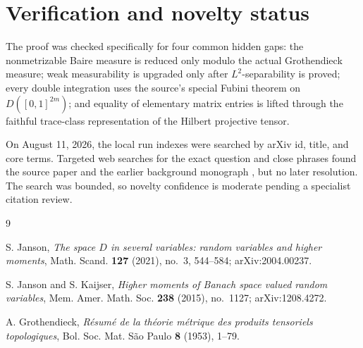 \documentclass[11pt]{article}
\begin{document}
\section{Verification and novelty status}

The proof was checked specifically for four common hidden gaps: the
nonmetrizable Baire measure is reduced only modulo the actual Grothendieck
measure; weak measurability is upgraded only after $L^2$-separability is
proved; every double integration uses the source's special Fubini theorem on
$D([0,1]^{2m})$; and equality of elementary matrix entries is lifted through
the faithful trace-class representation of the Hilbert projective tensor.

On August 11, 2026, the local run indexes were searched by arXiv id, title,
and core terms.  Targeted web searches for the exact question and close
phrases found the source paper and the earlier background monograph
\cite{JansonKaijser}, but no later resolution.  The search was bounded, so
novelty confidence is moderate pending a specialist citation review.

\begin{thebibliography}{9}

S. Janson,
\emph{The space $D$ in several variables: random variables and higher
moments},
Math. Scand. \textbf{127} (2021), no.~3, 544--584;
arXiv:2004.00237.

S. Janson and S. Kaijser,
\emph{Higher moments of Banach space valued random variables},
Mem. Amer. Math. Soc. \textbf{238} (2015), no.~1127;
arXiv:1208.4272.

A. Grothendieck,
\emph{R\'esum\'e de la th\'eorie m\'etrique des produits tensoriels
topologiques},
Bol. Soc. Mat. S\~ao Paulo \textbf{8} (1953), 1--79.

\end{thebibliography}
\end{document}
